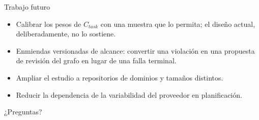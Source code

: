 \documentclass[10pt,aspectratio=169]{beamer}
\begin{document}
\begin{frame}{Trabajo futuro}
  \begin{itemize}
    \item Calibrar los pesos de $C_{\mathit{task}}$ con una muestra que lo
      permita; el diseño actual, deliberadamente, no lo sostiene.
    \item Enmiendas versionadas de alcance: convertir una violación en una
      propuesta de revisión del grafo en lugar de una falla terminal.
    \item Ampliar el estudio a repositorios de dominios y tamaños distintos.
    \item Reducir la dependencia de la variabilidad del proveedor en
      planificación.
  \end{itemize}

  \vfill
  \begin{center}
    \large ¿Preguntas?
  \end{center}
\end{frame}
\end{document}
